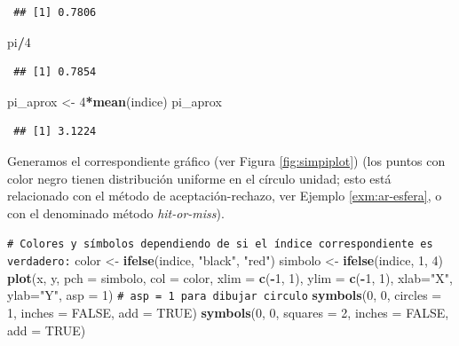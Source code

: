 \documentclass[
  spanish,
  10pt,
]{book}
\newenvironment{Shaded}{\begin{snugshade}}{\end{snugshade}}
\newcommand{\AttributeTok}[1]{\textcolor[rgb]{0.13,0.29,0.53}{#1}}
\newcommand{\CommentTok}[1]{\textcolor[rgb]{0.56,0.35,0.01}{\textit{#1}}}
\newcommand{\ConstantTok}[1]{\textcolor[rgb]{0.56,0.35,0.01}{#1}}
\newcommand{\DecValTok}[1]{\textcolor[rgb]{0.00,0.00,0.81}{#1}}
\newcommand{\FunctionTok}[1]{\textcolor[rgb]{0.13,0.29,0.53}{\textbf{#1}}}
\newcommand{\NormalTok}[1]{#1}
\newcommand{\OtherTok}[1]{\textcolor[rgb]{0.56,0.35,0.01}{#1}}
\newcommand{\SpecialCharTok}[1]{\textcolor[rgb]{0.81,0.36,0.00}{\textbf{#1}}}
\newcommand{\StringTok}[1]{\textcolor[rgb]{0.31,0.60,0.02}{#1}}
\theoremstyle{break}
\theoremstyle{nonumberplain}
\renewcommand{\CommentTok}[1]{\textcolor[rgb]{0.41,0.41,0.41}{\texttt{#1}}}
\begin{document}
\begin{verbatim}
 ## [1] 0.7806
\end{verbatim}

\begin{Shaded}
\begin{Highlighting}[]
\NormalTok{pi}\SpecialCharTok{/}\DecValTok{4}
\end{Highlighting}
\end{Shaded}

\begin{verbatim}
 ## [1] 0.7854
\end{verbatim}

\begin{Shaded}
\begin{Highlighting}[]
\NormalTok{pi\_aprox }\OtherTok{\textless{}{-}} \DecValTok{4}\SpecialCharTok{*}\FunctionTok{mean}\NormalTok{(indice)}
\NormalTok{pi\_aprox}
\end{Highlighting}
\end{Shaded}

\begin{verbatim}
 ## [1] 3.1224
\end{verbatim}

Generamos el correspondiente gráfico (ver Figura \ref{fig:simpiplot}) (los puntos con color negro tienen distribución uniforme en el círculo unidad; esto está relacionado con el método de aceptación-rechazo, ver Ejemplo \ref{exm:ar-esfera}, o con el denominado método \emph{hit-or-miss}).

\begin{Shaded}
\begin{Highlighting}[]
\CommentTok{\# Colores y símbolos dependiendo de si el índice correspondiente es verdadero:}
\NormalTok{color }\OtherTok{\textless{}{-}} \FunctionTok{ifelse}\NormalTok{(indice, }\StringTok{"black"}\NormalTok{, }\StringTok{"red"}\NormalTok{) }
\NormalTok{simbolo }\OtherTok{\textless{}{-}} \FunctionTok{ifelse}\NormalTok{(indice, }\DecValTok{1}\NormalTok{, }\DecValTok{4}\NormalTok{)}
\FunctionTok{plot}\NormalTok{(x, y, }\AttributeTok{pch =}\NormalTok{ simbolo, }\AttributeTok{col =}\NormalTok{ color, }
     \AttributeTok{xlim =} \FunctionTok{c}\NormalTok{(}\SpecialCharTok{{-}}\DecValTok{1}\NormalTok{, }\DecValTok{1}\NormalTok{), }\AttributeTok{ylim =} \FunctionTok{c}\NormalTok{(}\SpecialCharTok{{-}}\DecValTok{1}\NormalTok{, }\DecValTok{1}\NormalTok{), }\AttributeTok{xlab=}\StringTok{"X"}\NormalTok{, }\AttributeTok{ylab=}\StringTok{"Y"}\NormalTok{, }\AttributeTok{asp =} \DecValTok{1}\NormalTok{) }
     \CommentTok{\# asp = 1 para dibujar circulo}
\FunctionTok{symbols}\NormalTok{(}\DecValTok{0}\NormalTok{, }\DecValTok{0}\NormalTok{, }\AttributeTok{circles =} \DecValTok{1}\NormalTok{, }\AttributeTok{inches =} \ConstantTok{FALSE}\NormalTok{, }\AttributeTok{add =} \ConstantTok{TRUE}\NormalTok{)}
\FunctionTok{symbols}\NormalTok{(}\DecValTok{0}\NormalTok{, }\DecValTok{0}\NormalTok{, }\AttributeTok{squares =} \DecValTok{2}\NormalTok{, }\AttributeTok{inches =} \ConstantTok{FALSE}\NormalTok{, }\AttributeTok{add =} \ConstantTok{TRUE}\NormalTok{)}
\end{Highlighting}
\end{Shaded}
\end{document}
